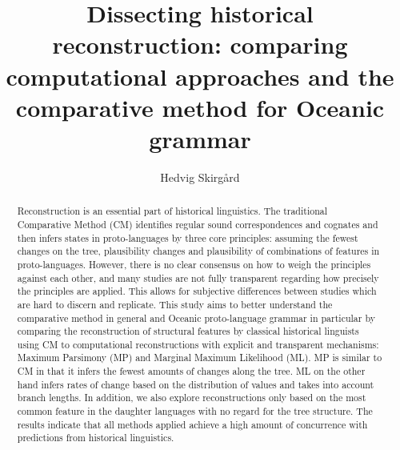 \documentclass[a4paper,10pt]{article} %
\title{Dissecting historical reconstruction: comparing computational approaches and the comparative method for Oceanic grammar}
\author{Hedvig Skirg{\aa}rd}
\begin{document}
\def\code#1{\texttt{#1}}

\thispagestyle{empty}

\maketitle
\thispagestyle{empty}

\tableofcontents
\newpage




\begin{abstract}
Reconstruction is an essential part of historical linguistics. The traditional Comparative Method (CM) identifies regular sound correspondences and cognates and then infers states in proto-languages by three core principles: assuming the fewest changes on the tree, plausibility changes and plausibility of combinations of features in proto-languages. However, there is no clear consensus on how to weigh the principles against each other, and many studies are not fully transparent regarding how precisely the principles are applied. This allows for subjective differences between studies which are hard to discern and replicate. This study aims to better understand the comparative method in general and Oceanic proto-language grammar in particular by comparing the reconstruction of structural features by classical historical linguists using CM to computational reconstructions with explicit and transparent mechanisms: Maximum Parsimony (MP) and Marginal Maximum Likelihood (ML). MP is similar to CM in that it infers the fewest amounts of changes along the tree. ML on the other hand infers rates of change based on the distribution of values and takes into account branch lengths. In addition, we also explore reconstructions only based on the most common feature in the daughter languages with no regard for the tree structure. The results indicate that all methods applied achieve a high amount of concurrence with predictions from historical linguistics. 





\end{abstract}
\end{document}
